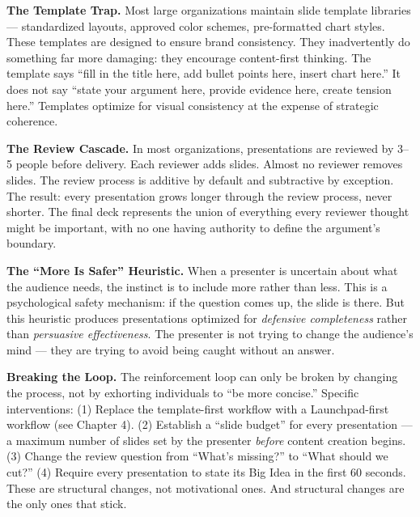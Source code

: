 \textbf{The Template Trap.} Most large organizations maintain slide template libraries --- standardized layouts, approved color schemes, pre-formatted chart styles. These templates are designed to ensure brand consistency. They inadvertently do something far more damaging: they encourage content-first thinking. The template says ``fill in the title here, add bullet points here, insert chart here.'' It does not say ``state your argument here, provide evidence here, create tension here.'' Templates optimize for visual consistency at the expense of strategic coherence.

\textbf{The Review Cascade.} In most organizations, presentations are reviewed by 3--5 people before delivery. Each reviewer adds slides. Almost no reviewer removes slides. The review process is additive by default and subtractive by exception. The result: every presentation grows longer through the review process, never shorter. The final deck represents the union of everything every reviewer thought might be important, with no one having authority to define the argument's boundary.

\textbf{The ``More Is Safer'' Heuristic.} When a presenter is uncertain about what the audience needs, the instinct is to include more rather than less. This is a psychological safety mechanism: if the question comes up, the slide is there. But this heuristic produces presentations optimized for \emph{defensive completeness} rather than \emph{persuasive effectiveness}. The presenter is not trying to change the audience's mind --- they are trying to avoid being caught without an answer.

\begin{diagnosisbox}
\textbf{Breaking the Loop.} The reinforcement loop can only be broken by changing the process, not by exhorting individuals to ``be more concise.'' Specific interventions: (1) Replace the template-first workflow with a Launchpad-first workflow (see Chapter 4). (2) Establish a ``slide budget'' for every presentation --- a maximum number of slides set by the presenter \emph{before} content creation begins. (3) Change the review question from ``What's missing?'' to ``What should we cut?'' (4) Require every presentation to state its Big Idea in the first 60 seconds. These are structural changes, not motivational ones. And structural changes are the only ones that stick.
\end{diagnosisbox}

